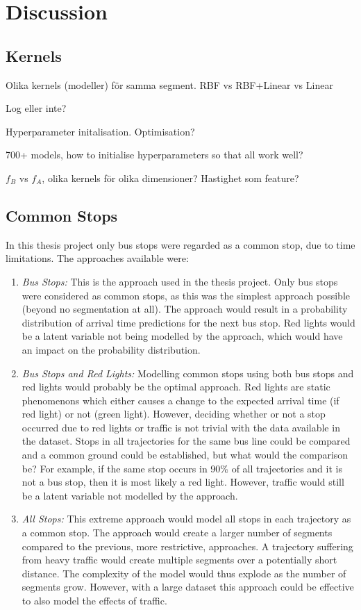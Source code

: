 \section{Discussion}

\subsection{Kernels}
Olika kernels (modeller) för samma segment.
RBF vs RBF+Linear vs Linear

Log eller inte?

Hyperparameter initalisation.
Optimisation?

700+ models, how to initialise hyperparameters so that all work well?

$f_B$ vs $f_A$, olika kernels för olika dimensioner? Hastighet som feature?
\subsection{Common Stops}
In this thesis project only bus stops were regarded as a common stop, due to time limitations.
The approaches available were:
\begin{enumerate}
    \item \textit{Bus Stops:} 
    This is the approach used in the thesis project.
    Only bus stops were considered as common stops, as this was the simplest approach possible (beyond no segmentation at all).
    The approach would result in a probability distribution of arrival time predictions for the next bus stop.
    Red lights would be a latent variable not being modelled by the approach, which would have an impact on the probability distribution.
    \item \textit{Bus Stops and Red Lights:}
    Modelling common stops using both bus stops and red lights would probably be the optimal approach.
    Red lights are static phenomenons which either causes a change to the expected arrival time (if red light) or not (green light).
    However, deciding whether or not a stop occurred due to red lights or traffic is not trivial with the data available in the dataset.
    Stops in all trajectories for the same bus line could be compared and a common ground could be established, but what would the comparison be?
    For example, if the same stop occurs in 90\% of all trajectories and it is not a bus stop, then it is most likely a red light.
    However, traffic would still be a latent variable not modelled by the approach.
    \item \textit{All Stops:}
    This extreme approach would model all stops in each trajectory as a common stop.
    The approach would create a larger number of segments compared to the previous, more restrictive, approaches.
    A trajectory suffering from heavy traffic would create multiple segments over a potentially short distance.
    The complexity of the model would thus explode as the number of segments grow.
    However, with a large dataset this approach could be effective to also model the effects of traffic.
\end{enumerate} 

